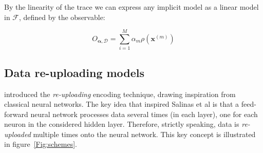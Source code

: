 By the linearity of the trace we can express any implicit model as a linear model in $\mathcal{F}$, defined by the 
observable:

\begin{equation}
    O_{\bm{\alpha}, \mathcal{D}} = \sum_{i=1}^M \alpha_m \rho(\bm{x}^{(m)})
\end{equation}


\subsection{Data re-uploading models}

\cite{P_rez_Salinas_2020} introduced the \textit{re-uploading} encoding technique,
drawing inspiration from classical neural networks.
The key idea that inspired Salinas et al is that a feed-forward neural network processes data several times
(in each layer), one for each neuron in the considered hidden layer. 
Therefore, strictly speaking, data is \textit{re-uploaded} multiple times onto the neural network.
This key concept is illustrated in figure~\ref{Fig:schemes}.



